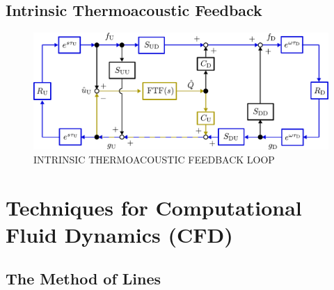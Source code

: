 






\subsection{Intrinsic Thermoacoustic Feedback}

\begin{figure}[t]
\centering
\includegraphics[scale=0.65]{assets/imgs/ITA-mech.pdf}
\caption{INTRINSIC THERMOACOUSTIC FEEDBACK LOOP}
\label{fig:ita-loop}
\end{figure}



\cite{emmert2015IntrinsicThermoacousticInstability}
\cite{silva2023IntrinsicThermoacousticInstabilities}
\cite{hoeijmakers2014IntrinsicInstabilityFlame}
\cite{hoeijmakers2016FlameDominatedThermoacoustic}
\cite{orchini2025TrackingAcousticIntrinsic}
\cite{chen2024BiglobalLinearStability}






\section{Techniques for Computational Fluid Dynamics (CFD)}

\subsection{The Method of Lines}

